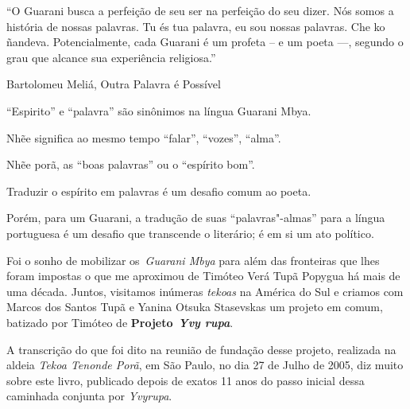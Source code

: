  

 

 

\epigraph{``O Guarani busca a perfeição de seu ser na perfeição do seu dizer. Nós
somos a história de nossas palavras. Tu és tua palavra, eu sou nossas
palavras. Che ko ñandeva. Potencialmente, cada Guarani é um profeta -- e
um poeta \mbox{---,} segundo o grau que alcance sua experiência religiosa.''}{Bartolomeu Meliá, Outra Palavra é Possível} 

 

``Espirito'' e ``palavra'' são sinônimos na língua Guarani Mbya.

Nhẽe significa ao mesmo tempo ``falar'', ``vozes'', ``alma''.

Nhẽe porã, as ``boas palavras'' ou o ``espírito bom''.

Traduzir o espírito em palavras é um desafio comum ao poeta.

Porém, para um Guarani, a tradução de suas ``palavras"-almas'' para a
língua portuguesa é um desafio que transcende o literário; é em si um
ato político.

Foi o sonho de mobilizar os~\emph{Guarani Mbya} para além das fronteiras
que lhes foram impostas o que me aproximou de Timóteo Verá Tupã Popygua
há mais de uma década. Juntos, visitamos inúmeras \emph{tekoas} na
América do Sul e criamos com Marcos dos Santos Tupã e Yanina Otsuka
Stasevskas um projeto em comum, batizado por Timóteo de
\textbf{Projeto}~\emph{\textbf{Yvy rupa}}.

A transcrição do que foi dito na reunião de fundação desse projeto,
realizada na aldeia \emph{Tekoa Tenonde Porã}, em São Paulo, no dia 27
de Julho de 2005, diz muito sobre este livro, publicado depois de exatos
11 anos do passo inicial dessa caminhada conjunta por \emph{Yvyrupa}.

 

